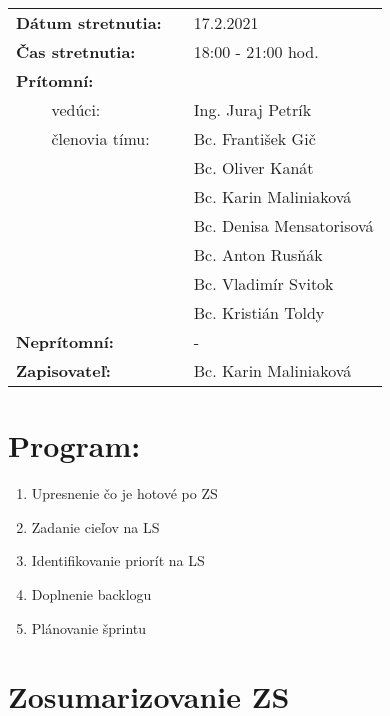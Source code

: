\documentclass{article}
\begin{document}
    

    \begin{table}[h]
        \begin{tabular}{lllll}
            \multicolumn{3}{l}{\textbf{Dátum stretnutia:}} & & 17.2.2021 \\
            \multicolumn{3}{l}{\textbf{Čas stretnutia:}} & & 18:00 - 21:00 hod. \\
            \multicolumn{3}{l}{\textbf{Prítomní:}} \\
            & & vedúci: & & Ing. Juraj Petrík \\
            & & členovia tímu: & & Bc. František Gič  \\
            & & & & Bc. Oliver Kanát \\
            & & & & Bc. Karin Maliniaková \\
            & & & & Bc. Denisa Mensatorisová \\
            & & & & Bc. Anton Rusňák \\
            & & & & Bc. Vladimír Svitok \\
            & & & & Bc. Kristián Toldy \\
            \multicolumn{3}{l}{\textbf{Neprítomní:}} & & -\\
            \multicolumn{3}{l}{\textbf{Zapisovateľ:}} & & Bc. Karin Maliniaková \\
        \end{tabular}
        \label{tab:grades}
    \end{table}

    \section*{Program:}

    \begin{enumerate}
        \item Upresnenie čo je hotové po ZS
        \item Zadanie cieľov na LS
        \item Identifikovanie priorít na LS
        \item Doplnenie backlogu
        \item Plánovanie šprintu
    \end{enumerate}

    \section*{Zosumarizovanie ZS}
\end{document}
